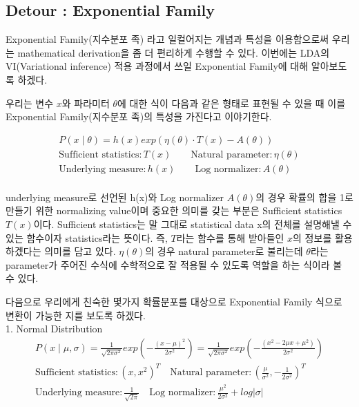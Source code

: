 \documentclass[draft=false]{oblivoir}
\begin{document}
\subsection{Detour : Exponential Family}
Exponential Family(지수분포 족) 라고 일컬어지는 개념과 특성을 이용함으로써 우리는 mathematical derivation을 좀 더 편리하게 수행할 수 있다. 이번에는 LDA의 VI(Variational inference) 적용 과정에서 쓰일 Exponential Family에 대해 알아보도록 하겠다. 

우리는 변수 $x$와 파라미터 $\theta$에 대한 식이 다음과 같은 형태로 표현될 수 있을 때 이를 Exponential Family(지수분포 족)의 특성을 가진다고 이야기한다. 

\begin{gather*}
P(x\mid \theta)=h(x)exp(\eta(\theta)\cdot T(x)-A(\theta))\\
\text{Sufficient statistics} : T(x) \qquad
\text{Natural parameter} : \eta(\theta)\\
\text{Underlying measure} : h(x) \qquad
\text{Log normalizer} : A(\theta)\\
\end{gather*}

underlying measure로 선언된 h(x)와 Log normalizer $A(\theta)$의 경우 확률의 합을 1로 만들기 위한 normalizing value이며 중요한 의미를 갖는 부분은 Sufficient statistics $T(x)$이다. Sufficient statistics는 말 그대로 statistical data x의 전체를 설명해낼 수 있는 함수이자 statistics라는 뜻이다. 즉, $T$라는 함수를 통해 받아들인 $x$의 정보를 활용하겠다는 의미를 담고 있다. $\eta(\theta)$의 경우 natural parameter로 불리는데 $\theta$라는 parameter가 주어진 수식에 수학적으로 잘 적용될 수 있도록 역할을 하는 식이라 볼 수 있다. 

다음으로 우리에게 친숙한 몇가지 확률분포를 대상으로 Exponential Family 식으로 변환이 가능한 지를 보도록 하겠다. \\

1. Normal Distribution
\begin{gather*}
P(x\mid \mu,\sigma) = \frac{1}{\sqrt{2\pi\sigma^2}}exp(-\frac{(x-\mu)^2}{2\sigma^2})=\frac{1}{\sqrt{2\pi\sigma^2}}exp(-\frac{(x^2-2\mu x+\mu^2)}{2\sigma^2})\nonumber\\
\text{Sufficient statistics} : {(x,x^2)}^T \quad
\text{Natural parameter} : {(\frac{\mu}{\sigma^2},-\frac{1}{2\sigma^2})}^T\\
\text{Underlying measure} : \frac{1}{\sqrt{2\pi}} \quad
\text{Log normalizer} : \frac{\mu^2}{2\sigma^2}+log|\sigma|
\end{gather*}
\end{document}
